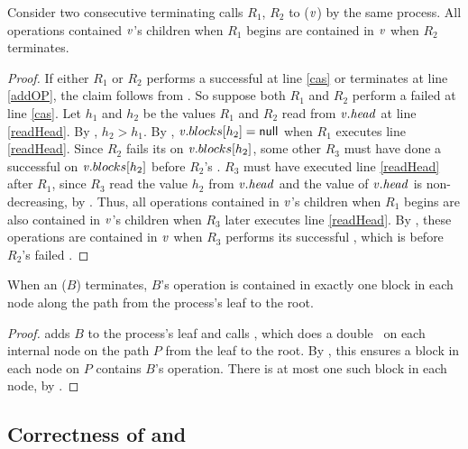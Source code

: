 \begin{lemma}\label{lem::doubleRefresh}
Consider two consecutive terminating calls $R_1$, $R_2$ to ($\mbox{\textnormal{\textit{v}}}$) by the same process.
All operations contained $\mbox{\textnormal{\textit{v}}}$'s children when $R_1$ begins
are contained in $\mbox{\textnormal{\textit{v}}}$ when $R_2$ terminates.
\end{lemma}
\begin{proof}
If either $R_1$ or $R_2$ performs a successful  at line \ref{cas} or terminates at line \ref{addOP}, the claim follows
from .
So suppose both $R_1$ and $R_2$ perform a failed  at line \ref{cas}.
Let $h_1$ and $h_2$ be the values $R_1$ and $R_2$ read from $\mbox{\textnormal{\textit{v}}}.\mbox{\textit{head}}$ at line \ref{readHead}.
By , $h_2>h_1$.
By , $\mbox{\textnormal{\textit{v}}}.blocks[h_2]=\mbox{\sf null}$ when $R_1$ executes line \ref{readHead}.
Since $R_2$ fails its  on $\mbox{\textnormal{\textit{v}}}.blocks[h_2]$, some other  $R_3$ must have done
a successful  on $\mbox{\textnormal{\textit{v}}}.blocks[h_2]$ before $R_2$'s .
$R_3$ must have executed line \ref{readHead} after $R_1$, since $R_3$ read the value $h_2$ from $\mbox{\textnormal{\textit{v}}}.\mbox{\textit{head}}$ and the value of $\mbox{\textnormal{\textit{v}}}.\mbox{\textit{head}}$ is non-decreasing, by .
Thus, all operations contained in $\mbox{\textnormal{\textit{v}}}$'s children when $R_1$ begins
are also contained in $\mbox{\textnormal{\textit{v}}}$'s children when $R_3$ later executes line \ref{readHead}.
By , these operations are contained in $\mbox{\textnormal{\textit{v}}}$ when $R_3$ performs its successful ,
which is before $R_2$'s failed .
\end{proof}

\begin{lemma} \label{lem::appendExactlyOnce}
When an ($B$) terminates, $B$'s operation is contained in exactly one block in each node along the path from the process's leaf to the root.
\end{lemma}
\begin{proof}
 adds $B$ to the process's leaf and calls , which
does a double ~on each internal node on the path $P$ from the leaf to the root.
By , this ensures a block in each node on $P$ contains $B$'s operation.
There is at most one such block in each node, by .
\end{proof}


\subsection{Correctness of  and }
\label{sec::tracingCorrect}

